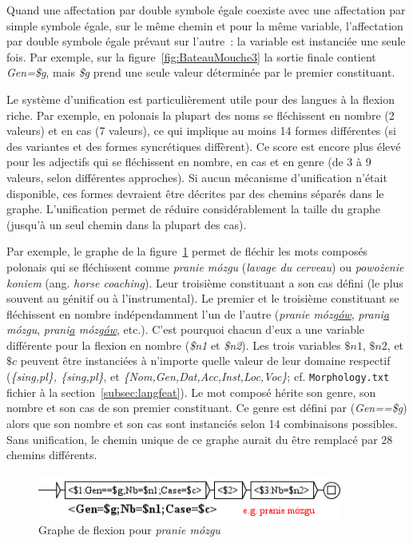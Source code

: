 \bigskip
\noindent Quand une affectation par double symbole égale coexiste avec une affectation par simple symbole égale,
sur le même chemin et pour la même variable, l'affectation par double symbole égale prévaut sur l'autre~: la
variable est instanciée une seule fois. Par exemple, sur la figure~\ref{fig:BateauMouche3} la sortie finale
contient \emph{Gen=\$g}, mais \emph{\$g} prend une seule valeur
déterminée par le premier constituant.

\bigskip
\noindent Le système d'unification est particulièrement utile pour des langues à la flexion riche.
Par exemple, en polonais la plupart des noms se fléchissent en nombre (2 valeurs) et en cas (7
valeurs), ce qui implique au moins 14 formes différentes (si des variantes et des formes
syncrétiques diffèrent).
Ce score est encore plus élevé pour les adjectifs qui se fléchissent en nombre, en cas et en genre
(de 3 à 9 valeurs, selon différentes approches). Si aucun mécanisme d'unification n'était
disponible, ces formes devraient être décrites par des chemins séparés dans le graphe.
L'unification permet de réduire considérablement la taille du graphe (jusqu'à un seul chemin dans la
plupart des cas).

\bigskip
\noindent Par exemple, le graphe de la figure~\ref{fig:PranieMozgu} permet de fléchir les mots
composés polonais qui se fléchissent comme \emph{pranie m\'ozgu} (\emph{lavage du cerveau}) ou
\emph{powo\.zenie koniem} (ang. \emph{horse coaching}). Leur troisième constituant a son cas défini
(le plus souvent au génitif ou à l'instrumental). Le premier et le troisième constituant se
fléchissent en nombre indépendamment l'un de l'autre  (\emph{pranie m\'ozg\underline{\'ow}},
\emph{prani\underline{a} m\'ozgu}, \emph{prani\underline{a} m\'ozg\underline{\'ow}}, etc.).
C'est pourquoi chacun d'eux a une variable différente pour la flexion en nombre  (\emph{\$n1} et
\emph{\$n2}). Les trois variables $\$n1$, $\$n2$, et $\$c$ peuvent être instanciées à n'importe
quelle valeur de leur domaine respectif  (\emph{\{sing,pl\}, \{sing,pl\}}, et
\emph{\{Nom,Gen,Dat,Acc,Inst,Loc,Voc\}}; cf. \verb+Morphology.txt+ fichier à la
section~\ref{subsec:langfeat}).
Le mot composé hérite son genre, son nombre et son cas de son premier constituant. Ce genre est
défini par (\emph{Gen==\$g}) alors que son nombre et son cas sont instanciés selon 14 combinaisons
possibles. Sans unification, le chemin unique de ce graphe aurait du être remplacé par 28 chemins
différents.

\begin{figure}[!htb]
  \centering
  \includegraphics[width=10cm]{resources/img/PranieMozgu.png}
  \caption{Graphe de flexion pour \emph{pranie m\'ozgu}}
  \label{fig:PranieMozgu}
\end{figure}


